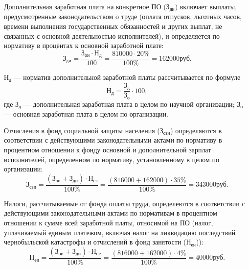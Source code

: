 Дополнительная заработная плата на конкретное ПО (\( \text{З}_{\text{ди}} \)) включает выплаты, предусмотренные законодательством о труде (оплата отпусков, льготных часов, времени выполнения государственных обязанностей и других выплат, не связанных с основной деятельностью исполнителей), и определяется по нормативу в процентах к основной заработной плате:
\begin{displaymath}
  \text{З}_{\text{ди}} = \frac{\text{З}_{\text{ои}} \cdot \text{Н}_{\text{д}}}{100} = \frac{810000 \cdot 20\%}{100\%} = 162000 \text{руб.}
\end{displaymath}

\( \text{Н}_{\text{д}} \) --- норматив дополнительной заработной платы рассчитывается по формуле
\begin{displaymath}
  \text{Н}_{\text{д}} = \frac{\text{З}_{\text{д}}}{\text{З}_{\text{о}}} \cdot 100,
\end{displaymath}
где \( \text{З}_{\text{д}} \) --- дополнительная заработная плата в целом по научной организации; \( \text{З}_{\text{о}} \) --- основная заработная плата в целом по организации.

Отчисления в фонд социальной защиты населения (\( \text{З}_{\text{сзи}} \)) определяются в соответствии с действующими законодательными актами по нормативу в процентном отношении к фонду основной и дополнительной зарплат исполнителей, определенном по нормативу, установленному в целом по организации:
\begin{displaymath}
  \text{З}_{\text{сзи}} = \frac{(\text{З}_{\text{ои}} + \text{З}_{\text{ди}}) \cdot \text{Н}_{\text{сз}}}{100\%} = \frac{(816000 + 162000) \cdot 35\%}{100\%} = 343000 \text{руб}.
\end{displaymath}

Налоги, рассчитываемые от фонда оплаты труда, определеются в соответствии с действующими законодательными актами по нормативам в процентном отношении к сумме всей заработной платы, относимой на ПО (налог, уплачиваемый единым платежом, включая налог на ликвидацию последствий чернобыльской катастрофы и отчислений в фонд занятости (\( \text{Н}_{\text{еи}} \))):
\begin{displaymath}
  \text{Н}_{\text{еи}} = \frac{(\text{З}_{\text{ои}} + \text{З}_{\text{ди}}) \cdot \text{Н}_{\text{не}}}{100\%} = \frac{(816000 + 162000) \cdot 4\%}{100\%} = 40000 \text{руб}.
\end{displaymath}

